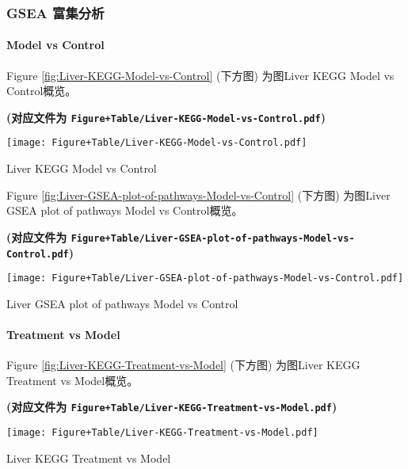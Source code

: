\documentclass[
]{article}
\begin{document}
\hypertarget{gsea-ux5bccux96c6ux5206ux6790}{%
\subsubsection{GSEA 富集分析}\label{gsea-ux5bccux96c6ux5206ux6790}}

\hypertarget{model-vs-control}{%
\paragraph{Model vs Control}\label{model-vs-control}}

Figure \ref{fig:Liver-KEGG-Model-vs-Control} (下方图) 为图Liver KEGG Model vs Control概览。

\textbf{(对应文件为 \texttt{Figure+Table/Liver-KEGG-Model-vs-Control.pdf})}

\def\@captype{figure}
\begin{center}
\texttt{[image: Figure+Table/Liver-KEGG-Model-vs-Control.pdf]}
\caption{Liver KEGG Model vs Control}\label{fig:Liver-KEGG-Model-vs-Control}
\end{center}

Figure \ref{fig:Liver-GSEA-plot-of-pathways-Model-vs-Control} (下方图) 为图Liver GSEA plot of pathways Model vs Control概览。

\textbf{(对应文件为 \texttt{Figure+Table/Liver-GSEA-plot-of-pathways-Model-vs-Control.pdf})}

\def\@captype{figure}
\begin{center}
\texttt{[image: Figure+Table/Liver-GSEA-plot-of-pathways-Model-vs-Control.pdf]}
\caption{Liver GSEA plot of pathways Model vs Control}\label{fig:Liver-GSEA-plot-of-pathways-Model-vs-Control}
\end{center}

\hypertarget{treatment-vs-model}{%
\paragraph{Treatment vs Model}\label{treatment-vs-model}}

Figure \ref{fig:Liver-KEGG-Treatment-vs-Model} (下方图) 为图Liver KEGG Treatment vs Model概览。

\textbf{(对应文件为 \texttt{Figure+Table/Liver-KEGG-Treatment-vs-Model.pdf})}

\def\@captype{figure}
\begin{center}
\texttt{[image: Figure+Table/Liver-KEGG-Treatment-vs-Model.pdf]}
\caption{Liver KEGG Treatment vs Model}\label{fig:Liver-KEGG-Treatment-vs-Model}
\end{center}
\end{document}
